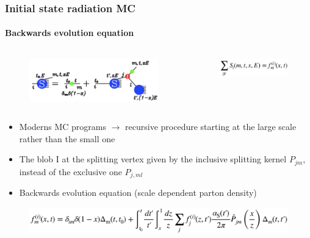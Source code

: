 \documentclass[aspectratio=43]{beamer}
\begin{document}
\begin{frame}

	\frametitle{Initial state radiation MC}
	\framesubtitle{Backwards evolution equation}
	
	\begin{columns}
		
		
		\begin{figure}
			\includegraphics[width = 6.5 cm]{plots/ISR_backwards.png}
		\end{figure}
		
		
		\begin{figure}
			\includegraphics[width = 4 cm]{plots/ISR_backwards_eq1.png}
		\end{figure}
		
	\end{columns}
	
	\vspace{0.5cm}
	
	\begin{itemize}
		\item \footnotesize Moderns MC programs $\rightarrow$ recursive procedure starting at the large scale rather than the small one \\
		\item \footnotesize The blob I at the splitting vertex given by the inclusive splitting kernel $P_{jm}$, instead of the exclusive one $P_{j, ml}$ \\
		\item \footnotesize Backwards evolution equation (scale dependent parton density)
	\end{itemize}

	\begin{figure}
		\includegraphics[width = 10 cm]{plots/ISR_backwards_eq2.png}
	\end{figure}

\end{frame}
\end{document}
